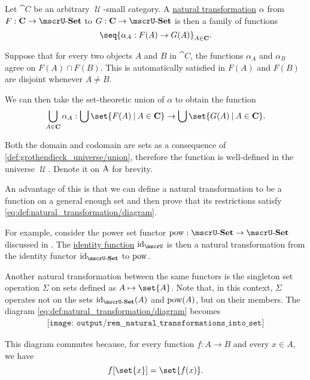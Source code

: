 \begin{remark}\label{rem:natural_transformations_into_set}
  Let \( \cat{C} \) be an arbitrary \( \mscrU \)-small category. A \hyperref[def:natural_transformation]{natural transformation} \( \alpha \) from \( F: \cat{C} \to \ucat{Set} \) to \( G: \cat{C} \to \ucat{Set} \) is then a family of functions
  \begin{equation*}
    \seq{ \alpha_A: F(A) \to G(A) }_{A \in \cat{C}}.
  \end{equation*}

  Suppose that for every two objects \( A \) and \( B \) in \( \cat{C} \), the functions \( \alpha_A \) and \( \alpha_B \) agree on \( F(A) \cap F(B) \). This is automatically satisfied in \( F(A) \) and \( F(B) \) are disjoint whenever \( A \neq B \).

  We can then take the set-theoretic union of \( \alpha \) to obtain the function
  \begin{equation*}
    \bigcup_{A \in \cat{C}} \alpha_A: \bigcup\set{ F(A) \given A \in \cat{C} } \to \bigcup\set{ G(A) \given A \in \cat{C} }.
  \end{equation*}

  Both the domain and codomain are sets as a consequence of \ref{def:grothendieck_universe/union}, therefore the function is well-defined in the universe \( \mscrU \). Denote it on \( \operatorname{A} \) for brevity.

  An advantage of this is that we can define a natural transformation to be a function on a general enough set and then prove that its restrictions satisfy \eqref{eq:def:natural_transformation/diagram}.

  For example, consider the power set functor \( \pow: \ucat{Set} \to \ucat{Set} \) discussed in . The \hyperref[def:multi_valued_function/identity]{identity function} \( \id_\mscrU \) is then a natural transformation from the identity functor \( \id_{\ucat{Set}} \) to \( \operatorname{pow} \).

  Another natural transformation between the same functors is the singleton set operation \( \Sigma \) on sets defined as \( A \mapsto \set{ A } \). Note that, in this context, \( \Sigma \) operates not on the sets \( \id_{\ucat{Set}}(A) \) and \( \operatorname{pow}(A) \), but on their members. The diagram \eqref{eq:def:natural_transformation/diagram} becomes
  \begin{equation}\label{eq:rem:natural_transformations_into_set}
    \begin{aligned}
      \texttt{[image: output/rem\_\_natural\_transformations\_into\_set]}
    \end{aligned}
  \end{equation}

  This diagram commutes because, for every function \( f: A \to B \) and every \( x \in A \), we have
  \begin{equation*}
    f[\set{ x }] = \set{ f(x) }.
  \end{equation*}
\end{remark}

